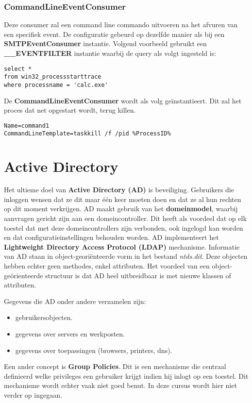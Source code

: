 \documentclass{report}
\begin{document}
	\subsection{CommandLineEventConsumer}
	Deze consumer zal een command line commando uitvoeren na het afvuren van een specifiek event. De configuratie gebeurd op dezelfde manier als bij een \textbf{SMTPEventConsumer} instantie. Volgend voorbeeld gebruikt een \textbf{\_\_EVENTFILTER} instantie waarbij de query als volgt ingesteld is:
	\begin{lstlisting}
select *
from win32_processstarttrace
where processname = 'calc.exe'
	\end{lstlisting}
	De \textbf{CommandLineEventConsumer} wordt als volg geïnstantieert. Dit zal het proces dat net opgestart wordt, terug killen.
	\begin{lstlisting}
Name=command1
CommandLineTemplate=taskkill /f /pid %ProcessID%
	\end{lstlisting}
	\chapter{Active Directory}
	Het ultieme doel van \textbf{Active Directory (AD)} is beveiliging. Gebruikers die inloggen wensen dat ze dit maar één keer moeten doen en dat ze al hun rechten op dit moment verkrijgen. AD maakt gebruik van het \textbf{domeinmodel}, waarbij aanvragen gericht zijn aan een domeincontroller. Dit heeft als voordeel dat op elk toestel dat met deze domeincontrollers zijn verbonden, ook ingelogd kan worden en dat configuratieinstellingen behouden worden. AD implementeert het \textbf{Lightweight Directory Access Protocol (LDAP)} mechanisme. Informatie van AD staan in object-georiënteerde vorm in het bestand \textit{ntds.dit}. Deze objecten hebben echter geen methodes, enkel attributen. Het voordeel van een object-geörienteerde structuur is dat AD heel uitbreidbaar is met nieuwe klassen of attributen.
	
	Gegevens die AD onder andere verzamelen zijn:
	\begin{itemize}
		\item gebruikersobjecten.
		\item gegevens over servers en werkposten.
		\item gegevens over toepassingen (browsers, printers, dns).
	\end{itemize}

	Een ander concept is \textbf{Group Policies}. Dit is een mechanisme die centraal definieerd welke privileges een gebruiker krijgt indien hij inlogt op een toestel. Dit mechanisme wordt echter vaak niet goed benut. In deze cursus wordt hier niet verder op ingegaan.
	
\end{document}
